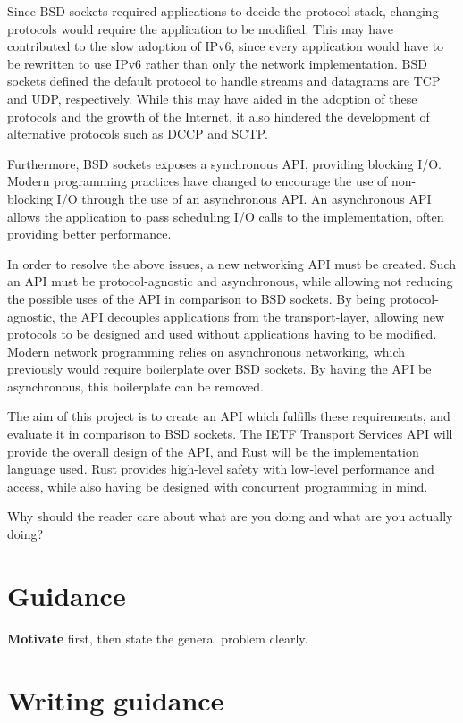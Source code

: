 \documentclass{l4proj}
\begin{document}
Since BSD sockets required applications to decide the protocol stack, changing protocols would require the application to be modified.
This may have contributed to the slow adoption of IPv6, since every application would have to be rewritten to use IPv6 rather than 
only the network implementation.
BSD sockets defined the default protocol to handle streams and datagrams are TCP and UDP, respectively.
While this may have aided in the adoption of these protocols and the growth of the Internet, it also hindered the development of 
alternative protocols such as DCCP and SCTP.

Furthermore, BSD sockets exposes a synchronous API, providing blocking I/O.
Modern programming practices have changed to encourage the use of non-blocking I/O through the use of an asynchronous API.
An asynchronous API allows the application to pass scheduling I/O calls to the implementation, often providing better performance.

In order to resolve the above issues, a new networking API must be created.
Such an API must be protocol-agnostic and asynchronous, while allowing not reducing the possible uses of the API in comparison to
BSD sockets.
By being protocol-agnostic, the API decouples applications from the transport-layer, allowing new protocols to be designed and used
without applications having to be modified.
Modern network programming relies on asynchronous networking, which previously would require boilerplate over BSD sockets.
By having the API be asynchronous, this boilerplate can be removed.

The aim of this project is to create an API which fulfills these requirements, and evaluate it in comparison to BSD sockets.
The IETF Transport Services API will provide the overall design of the API, and Rust will be the implementation language used.
Rust provides high-level safety with low-level performance and access, while also having be designed with concurrent programming in mind.


Why should the reader care about what are you doing and what are you actually doing?
\section{Guidance}

\textbf{Motivate} first, then state the general problem clearly. 

\section{Writing guidance}
\end{document}
